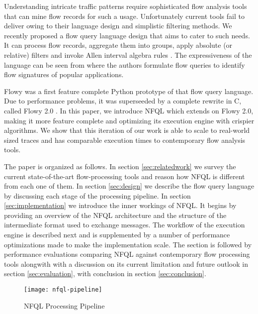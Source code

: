 Understanding intricate traffic patterns require sophisticated flow analysis
tools that can mine flow records for such a usage.  Unfortunately current
tools fail to deliver owing to their language design and simplistic filtering
methods.  We recently proposed a flow query language design
\cite{vmarinov:2009} that aims to cater to such needs.  It can process
flow records, aggregate them into groups, apply absolute (or relative) filters
and invoke Allen interval algebra rules \cite{fallen:1983}. The expressiveness
of the language can be seen from \cite{vperelman:2011} where the authors
formulate flow queries to identify flow signatures of popular applications.

Flowy \cite{kkanev:2010} was a first feature complete Python prototype of that
flow query language. Due to performance problems, it was superseeded by a
complete rewrite in C, called Flowy 2.0 \cite{jschauer:thesis:2011}. In this
paper, we introduce \ac{NFQL} which extends on Flowy 2.0, making it more
feature complete and optimizing its execution engine with crispier algorithms.
We show that this iteration of our work is able to scale to real-world sized
traces and has comparable execution times to contemporary flow analysis tools.

The paper is organized as follows. In section \ref{sec:relatedwork} we survey
the current state-of-the-art flow-processing tools and reason how \ac{NFQL} is
different from each one of them. In section \ref{sec:design} we describe the
flow query language by discussing each stage of the processing pipeline. In
section \ref{sec:implementation} we introduce the inner workings of \ac{NFQL}.
It begins by providing an overview of the \ac{NFQL} architecture and the
structure of the intermediate format used to exchange messages. The workflow of
the execution engine is described next and is supplemented by a number of
performance optimizations made to make the implementation scale. The section is
followed by performance evaluations comparing \ac{NFQL} against contemporary
flow processing tools alongwith with a discussion on its current limitation and
future outlook in section \ref{sec:evaluation}, with conclusion in section
\ref{sec:conclusion}.

\begin{figure*}[!t]
\centering
\texttt{[image: nfql-pipeline]}
\caption{NFQL Processing Pipeline \cite{vmarinov:2009}}
\label{fig:nfql-pipeline}
\end{figure*}
